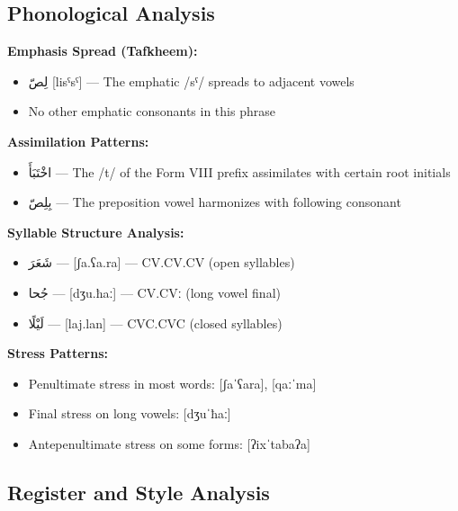 \documentclass[letterpaper,12pt]{article}
\begin{document}
\subsection{Phonological Analysis}

\begin{tcolorbox}[colback=white,colframe=dialectcolor,title=\textbf{Phonological Features},breakable]
\textbf{Emphasis Spread (Tafkheem):}
\begin{itemize}
\item \textarabic{لِصّ} [lisˤsˤ] — The emphatic /sˤ/ spreads to adjacent vowels
\item No other emphatic consonants in this phrase
\end{itemize}

\textbf{Assimilation Patterns:}
\begin{itemize}
\item \textarabic{اخْتَبَأَ} — The /t/ of the Form VIII prefix assimilates with certain root initials
\item \textarabic{بِلِصّ} — The preposition vowel harmonizes with following consonant
\end{itemize}

\textbf{Syllable Structure Analysis:}
\begin{itemize}
\item \textarabic{شَعَرَ} — [ʃa.ʕa.ra] — CV.CV.CV (open syllables)
\item \textarabic{جُحا} — [dʒu.ħaː] — CV.CVː (long vowel final)
\item \textarabic{لَيْلًا} — [laj.lan] — CVC.CVC (closed syllables)
\end{itemize}

\textbf{Stress Patterns:}
\begin{itemize}
\item Penultimate stress in most words: [ʃaˈʕara], [qaːˈma]
\item Final stress on long vowels: [dʒuˈħaː]
\item Antepenultimate stress on some forms: [ʔixˈtabaʔa]
\end{itemize}
\end{tcolorbox}

\subsection{Register and Style Analysis}
\end{document}
